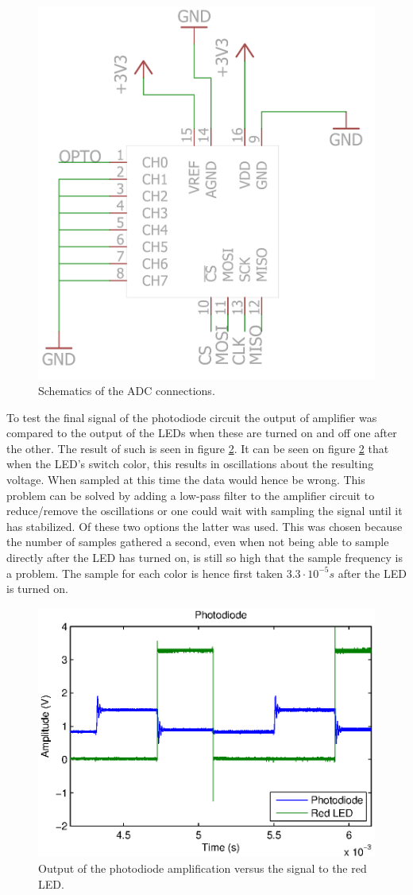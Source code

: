 \begin{figure}[H]
\centering 
\includegraphics[width = 0.4 \textwidth]{images/ADC_schematics}
\caption{Schematics of the ADC connections.}
\label{fig:adc_schematics}
\end{figure}


To test the final signal of the photodiode circuit the output of amplifier was compared to the output of the LEDs when these are turned on and off one after the other.
The result of such is seen in figure \ref{fig:photodiode_output}.
It can be seen on figure \ref{fig:photodiode_output} that when the LED's switch color, this results in oscillations about the resulting voltage.
When sampled at this time the data would hence be wrong.
This problem can be solved by adding a low-pass filter to the amplifier circuit to reduce/remove the oscillations or one could wait with sampling the signal until it has stabilized.
Of these two options the latter was used.
This was chosen because the number of samples gathered a second, even when not being able to sample directly after the LED has turned on, is still so high that the sample frequency is a problem.
The sample for each color is hence first taken $3.3 \cdot 10^{-5} s$ after the LED is turned on.


\begin{figure}[H]
\centering 
\includegraphics[width = 0.9 \textwidth]{images/photodiode}
\caption{Output of the photodiode amplification versus the signal to the red LED.}
\label{fig:photodiode_output}
\end{figure}

